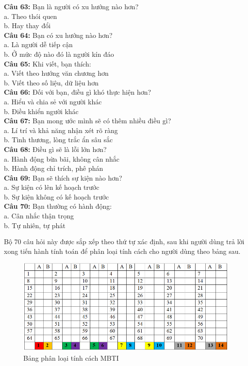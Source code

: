 \begin{multicols}{2}
\textbf{Câu 63:} Bạn là người có xu hướng nào hơn? \\
a. Theo thói quen \\
b. Hay thay đổi \\
\textbf{Câu 64:} Bạn có xu hướng nào hơn? \\
a. Là người dễ tiếp cận \\
b. Ở mức độ nào đó là người kín đáo \\
\textbf{Câu 65:} Khi viết, bạn thích: \\
a. Viết theo hướng văn chương hơn \\
b. Viết theo số liệu, dữ liệu hơn \\
\textbf{Câu 66:} Đối với bạn, điều gì khó thực hiện hơn? \\
a. Hiểu và chia sẻ với người khác \\
b. Điều khiển người khác \\
\textbf{Câu 67:} Bạn mong ước mình sẽ có thêm nhiều điều gì? \\
a. Lí trí và khả năng nhận xét rõ ràng \\
b. Tình thương, lòng trắc ẩn sâu sắc \\
\textbf{Câu 68:} Điều gì sẽ là lỗi lớn hơn? \\
a. Hành động bừa bãi, không cân nhắc \\
b. Hành động chỉ trích, phê phán \\
\textbf{Câu 69:} Bạn sẽ thích sự kiện nào hơn? \\
a. Sự kiện có lên kế hoạch trước \\
b. Sự kiện không có kế hoạch trước \\
\textbf{Câu 70:} Bạn thường có hành động: \\
a. Cân nhắc thận trọng \\
b. Tự nhiên, tự phát \\
\end{multicols}

Bộ 70 câu hỏi này được sắp xếp theo thứ tự xác định, sau khi người dùng trả lời xong tiến hành tính toán để phân loại tính cách cho người dùng theo bảng sau.
\begin{figure}[H]
    \centering
    \includegraphics[width=0.8\linewidth]{images/chap3/MBTItable.png}
    \vspace{0.5cm}
    \caption{Bảng phân loại tính cách MBTI}
\end{figure}

